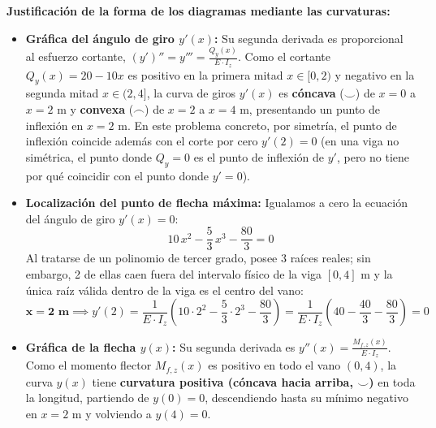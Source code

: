 {    \textbf{Justificación de la forma de los diagramas mediante las curvaturas:}
    \begin{itemize}
        \item \textbf{Gráfica del ángulo de giro $y'(x)$:} Su segunda derivada es proporcional al esfuerzo cortante, $(y')'' = y''' = \frac{Q_y(x)}{E \cdot I_z}$. Como el cortante $Q_y(x) = 20 - 10x$ es positivo en la primera mitad $x \in [0, 2)$ y negativo en la segunda mitad $x \in (2, 4]$, la curva de giros $y'(x)$ es \textbf{cóncava} ($\smile$) de $x = 0$ a $x = 2\text{ m}$ y \textbf{convexa} ($\frown$) de $x = 2$ a $x = 4\text{ m}$, presentando un punto de inflexión en $x = 2\text{ m}$. En este problema concreto, por simetría, el punto de inflexión coincide además con el corte por cero $y'(2) = 0$ (en una viga no simétrica, el punto donde $Q_y = 0$ es el punto de inflexión de $y'$, pero no tiene por qué coincidir con el punto donde $y' = 0$).
        \item \textbf{Localización del punto de flecha máxima:} Igualamos a cero la ecuación del ángulo de giro $y'(x) = 0$:
              \begin{equation}
                  10\,x^2 - \frac{5}{3}\,x^3 - \frac{80}{3} = 0
              \end{equation}
              Al tratarse de un polinomio de tercer grado, posee 3 raíces reales; sin embargo, 2 de ellas caen fuera del intervalo físico de la viga $[0, 4]\text{ m}$ y la única raíz válida dentro de la viga es el centro del vano:
              \begin{equation}
                  \mathbf{x = 2\text{ m}} \implies y'(2) = \frac{1}{E \cdot I_z}\left(10 \cdot 2^2 - \frac{5}{3} \cdot 2^3 - \frac{80}{3}\right) = \frac{1}{E \cdot I_z}\left(40 - \frac{40}{3} - \frac{80}{3}\right) = 0
              \end{equation}
        \item \textbf{Gráfica de la flecha $y(x)$:} Su segunda derivada es $y''(x) = \frac{M_{f,z}(x)}{E \cdot I_z}$. Como el momento flector $M_{f,z}(x)$ es positivo en todo el vano $(0, 4)$, la curva $y(x)$ tiene \textbf{curvatura positiva (cóncava hacia arriba, $\smile$)} en toda la longitud, partiendo de $y(0) = 0$, descendiendo hasta su mínimo negativo en $x = 2\text{ m}$ y volviendo a $y(4) = 0$.
    \end{itemize}

}
